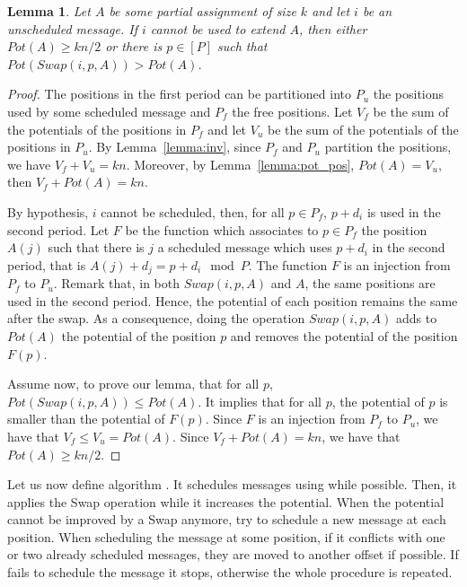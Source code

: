 \documentclass[pdflatex,sn-mathphys,iicol]{sn-jnl}%
\theoremstyle{thmstyleone}%
\newtheorem{lemma}[theorem]{Lemma}
\theoremstyle{thmstyletwo}%
\theoremstyle{thmstylethree}%
\begin{document}
\begin{lemma}\label{lemma:swap}
Let $A$ be some partial assignment of size $k$ and let $i$ be an unscheduled message. If $i$ cannot be used to extend $A$, then either $Pot(A) \geq kn/2$ or there is $p \in [P]$ such that $Pot(Swap(i,p,A)) > Pot(A)$.
\end{lemma}

\begin{proof}
The positions in the first period can be partitioned into $P_{u}$ the positions used by some scheduled message and $P_{f}$ the free positions.
Let $V_f$ be the sum of the potentials of the positions in $P_f$ and let $V_u$ be the sum of the potentials of the positions in $P_u$. By Lemma~\ref{lemma:inv}, since $P_f$ and $P_u$ partition the positions, we have $V_f + V_u = kn$. Moreover, by Lemma~\ref{lemma:pot_pos}, $Pot(A) = V_u$, then $V_f + Pot(A) = kn$.

By hypothesis, $i$ cannot be scheduled, then, for all $p \in P_{f}$, $p+d_i$ is used in the second period. Let $F$ be the function which associates to $p \in P_{f}$ the position $A(j)$ such that there is $j$ a scheduled message which uses $p+d_i$ in the second period, that is $A(j) + d_j = p + d_i \mod P$. The function $F$ is an injection from $P_{f}$ to $P_u$. Remark that, in both $Swap(i,p,A)$ and $A$, the same positions are used in the second period. Hence, the potential of each position remains the same after the swap. As a consequence, doing the operation $Swap(i,p,A)$ adds to $Pot(A)$ the potential of the position $p$ and removes the potential of the position $F(p)$. 

Assume now, to prove our lemma, that for all $p$, $Pot(Swap(i,p,A)) \leq Pot(A)$. It implies that for all $p$, the potential of $p$ is smaller than the potential of $F(p)$. Since $F$ is an injection from $P_f$ to $P_u$, we have that $V_f \leq V_u = Pot(A)$. Since $V_f + Pot(A) = kn$, we have that $Pot(A) \geq kn/2$.
\end{proof}

Let us now define algorithm \swapandmove. 
It schedules messages using \firstfit while possible. Then, it applies the Swap operation while it increases the potential. When the potential cannot be improved by a Swap anymore, \swapandmove try to schedule a new message at each position. When scheduling the message at some position, if it conflicts with one or two already scheduled messages, they are moved to another offset if possible. If \swapandmove fails to schedule the message it stops, otherwise the whole procedure is repeated. 
\end{document}
